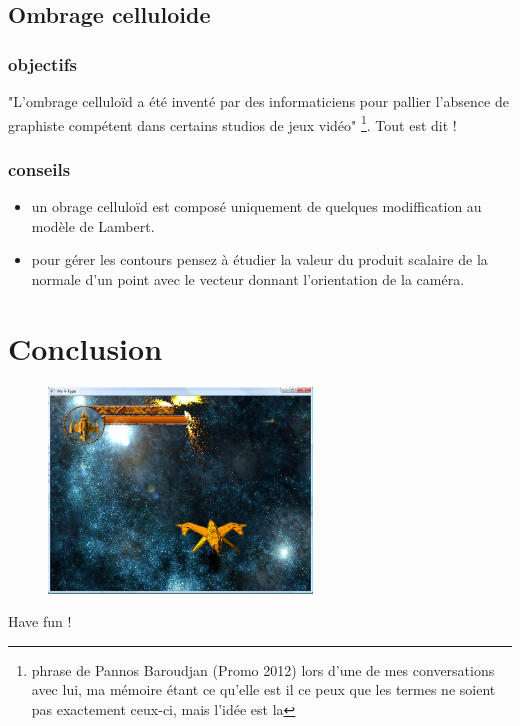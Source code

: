 \documentclass[12pt,a4paper]{report}
\begin{document}
\section{Ombrage celluloide}
\subsection{objectifs}
"L'ombrage celluloïd a été inventé par des informaticiens pour pallier l'absence
de graphiste compétent dans certains studios de jeux vidéo" \footnote{phrase de Pannos
Baroudjan (Promo 2012) lors d'une de mes conversations avec lui, ma mémoire
étant ce qu'elle est il ce peux que les termes ne soient pas exactement ceux-ci, mais l'idée est la}.
Tout est dit !
\subsection{conseils}
\begin{itemize}
\item un obrage celluloïd est composé uniquement de quelques modiffication au modèle de Lambert.
\item pour gérer les contours pensez à étudier la valeur du produit scalaire de la normale d'un point avec
le vecteur donnant l'orientation de la caméra.
\end{itemize}
\newpage


\chapter{Conclusion}
\begin{figure}[!h]\centering\includegraphics[width=7cm]{full_window.png}\end{figure}

Have fun !
 
\end{document}
